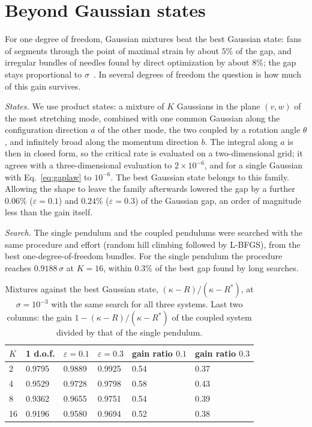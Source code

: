 \section{Beyond Gaussian states}
\label{sec:mixtures}

For one degree of freedom, Gaussian mixtures beat the best Gaussian state: fans of segments through the point of maximal strain by about $5\%$ of the gap, and irregular bundles of needles found by direct optimization by about $8\%$; the gap stays proportional to $\sigma$~\cite{namba2026gap}. In several degrees of freedom the question is how much of this gain survives.

\emph{States.} We use product states: a mixture of $K$ Gaussians in the plane $(v,w)$ of the most stretching mode, combined with one common Gaussian along the configuration direction $a$ of the other mode, the two coupled by a rotation angle $\theta$, and infinitely broad along the momentum direction $b$. The integral along $a$ is then in closed form, so the critical rate is evaluated on a two-dimensional grid; it agrees with a three-dimensional evaluation to $2\times10^{-6}$, and for a single Gaussian with Eq.~\eqref{eq:gaplaw} to $10^{-6}$. The best Gaussian state belongs to this family. Allowing the shape to leave the family afterwards lowered the gap by a further $0.06\%$ ($\varepsilon = 0.1$) and $0.24\%$ ($\varepsilon = 0.3$) of the Gaussian gap, an order of magnitude less than the gain itself.

\emph{Search.} The single pendulum and the coupled pendulums were searched with the same procedure and effort (random hill climbing followed by L-BFGS), from the best one-degree-of-freedom bundles. For the single pendulum the procedure reaches $0.9188\,\sigma$ at $K = 16$, within $0.3\%$ of the best gap found by long searches.

\begin{table}[t]
\caption{Mixtures against the best Gaussian state, $(\kappa - R)/(\kappa - R^*)$, at $\sigma = 10^{-3}$ with the same search for all three systems. Last two columns: the gain $1 - (\kappa-R)/(\kappa-R^*)$ of the coupled system divided by that of the single pendulum.}
\label{tab:mixtures}
\begin{ruledtabular}
\begin{tabular}{llllll}
$K$ & 1 d.o.f. & $\varepsilon = 0.1$ & $\varepsilon = 0.3$ & gain ratio $0.1$ & gain ratio $0.3$ \\
\hline
2 & 0.9795 & 0.9889 & 0.9925 & 0.54 & 0.37 \\
4 & 0.9529 & 0.9728 & 0.9798 & 0.58 & 0.43 \\
8 & 0.9362 & 0.9655 & 0.9751 & 0.54 & 0.39 \\
16 & 0.9196 & 0.9580 & 0.9694 & 0.52 & 0.38 \\
\end{tabular}
\end{ruledtabular}
\end{table}


